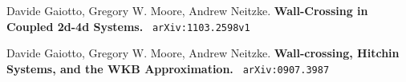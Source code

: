 \documentclass[12pt]{article}
\begin{document}
\selectfont \fontsize{12}{10}\selectfont

\begin{thebibliography}{}

\item Davide Gaiotto, Gregory W. Moore, Andrew Neitzke. \textbf{Wall-Crossing in Coupled 2d-4d Systems.} \texttt{ arXiv:1103.2598v1}


\item Davide Gaiotto, Gregory W. Moore, Andrew Neitzke. \textbf{Wall-crossing, Hitchin Systems, and the WKB Approximation.} \texttt{ arXiv:0907.3987}


\end{thebibliography}
\end{document}
